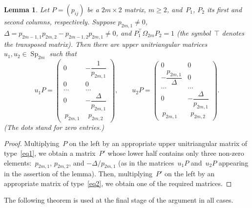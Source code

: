 \documentclass[12pt]{amsart}
\newtheorem{lemma}{Lemma}
\theoremstyle{definition}
\theoremstyle{remark}
\begin{document}
\begin{lemma}
\label{lem4} Let $P=(p_{ij})$ be a $2m\times 2$ matrix, $m{\geqslant} 2$,
and~$P_1$, $P_2$ its first and second columns, respectively. Suppose
$p_{2m,1}\ne0$, $\Delta=p_{2m-1,1}p_{2m,2}-p_{2m-1,2}p_{2m,1}\ne0$,
and $P_1^\top\Omega_{2m}P_2=1$ \textup{(}the symbol~$\top$ denotes
the transposed matrix\textup{)}. Then there are upper unitriangular
matrices $u_1, u_2\in {\operatorname{Sp}}_{2m}$ such that
$$
u_1P=\begin{pmatrix} 0 &-\dfrac{1}{p_{2m,1}}
\\
0 & 0
\\
\hdots & \hdots
\\
0 & -\dfrac{\Delta}{p_{2m,1}}
\\
\ p_{2m,1} & \ \ p_{2m,2}\end{pmatrix}, \qquad u_2P=\begin{pmatrix}
0 & 0
\\
-\dfrac{p_{2m,1}}{\Delta} & 0
\\
\hdots & \hdots
\\
0 & -\dfrac{\Delta}{p_{2m,1}}
\\
\ p_{2m,1} & \ \ p_{2m,2}
\end{pmatrix}.
$$
\textup{(}The dots stand for zero entries.\textup{)}
\end{lemma}

\begin{proof}
Multiplying~$P$ on the left by an appropriate upper unitriangular
matrix of type~\eqref{eq1}, we obtain a matrix~$P'$ whose lower half
contains only three non-zero elements:~$p_{2m,1}$, $p_{2m,2}$, and
$-\Delta/p_{2m,1}$ (as in the matrices~$u_1P$ and~$u_2P$ appearing
in the assertion of the lemma). Then, multiplying~$P'$ on the left
by an appropriate matrix of type~\eqref{eq2}, we obtain one of the
required matrices.
\end{proof}

The following theorem is used at the final stage of the argument in
all cases.
\end{document}
